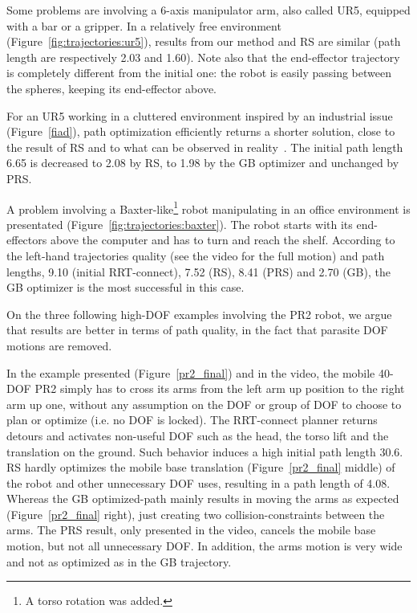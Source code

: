 \documentclass{tADR2e}
\begin{document}
Some problems are 
involving a 6-axis manipulator arm, also called UR5, equipped with a bar or a 
gripper.
In a relatively free environment (Figure~\ref{fig:trajectories:ur5}), 
results from our method and RS are similar (path length are respectively 2.03 and 1.60). 
Note also that the end-effector trajectory is completely different from the initial 
one: the robot is easily passing between the spheres, keeping its end-effector 
above.

For an UR5 working in a cluttered environment inspired by an industrial issue 
(Figure~\ref{fiad}), path optimization efficiently returns a shorter solution, close 
to the result of RS and to what can be observed in reality~\cite{factory-day-video}. 
The initial path length 6.65 is decreased to 2.08 by RS, to 
1.98 by the GB optimizer and unchanged by PRS.

A problem involving a Baxter-like\footnote{A torso rotation was added.} robot 
manipulating in an office environment is presentated 
(Figure~\ref{fig:trajectories:baxter}). The robot starts with its end-effectors 
above the computer and has to 
turn and reach the shelf. According to the left-hand trajectories quality (see the 
video for the full motion) and path lengths, 9.10 (initial RRT-connect), 7.52 (RS), 
8.41 (PRS) and 2.70 (GB), the GB optimizer is the most successful in this case.

\vspace{0.4cm}

On the three following high-DOF examples involving the PR2 robot, we argue that 
results are better in terms of path quality, in the fact that parasite DOF motions 
are removed.

In the example presented (Figure~\ref{pr2_final}) and in the video, the mobile 
40-DOF PR2 simply has to cross its arms from 
the left arm up position to the right arm up one, without any assumption on the DOF or group of DOF to choose to plan or optimize (i.e. no DOF is locked). 
The RRT-connect planner 
returns detours and activates non-useful DOF such as the head, the torso lift 
and the translation on the ground. Such behavior induces a high initial path length 
30.6. RS hardly optimizes the mobile base 
translation (Figure~\ref{pr2_final} middle) of the robot and other unnecessary DOF 
uses, resulting in a path length of 4.08.
Whereas the GB optimized-path mainly 
results in moving the arms as expected (Figure~\ref{pr2_final} right), just creating 
two collision-constraints between the arms. The PRS 
result, only presented in the video, cancels the mobile base motion, but not all 
unnecessary DOF. In addition, the arms motion is very wide and not as optimized as in the GB trajectory.
\end{document}
